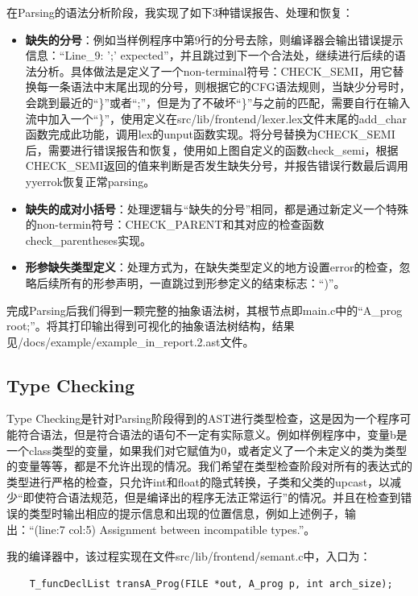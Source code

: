 \documentclass{article}
\begin{document}
在Parsing的语法分析阶段，我实现了如下3种错误报告、处理和恢复：
\begin{itemize}
    \item \textbf{缺失的分号}：例如当样例程序中第9行的分号去除，则编译器会输出错误提示信息：“Line\_9: ';' expected”，并且跳过到下一个合法处，继续进行后续的语法分析。具体做法是定义了一个non-terminal符号：CHECK\_SEMI，用它替换每一条语法中末尾出现的分号，则根据它的CFG语法规则，当缺少分号时，会跳到最近的“\}”或者“;”，但是为了不破坏“\}”与之前的匹配，需要自行在输入流中加入一个“\}”，使用定义在src/lib/frontend/lexer.lex文件末尾的add\_char函数完成此功能，调用lex的unput函数实现。将分号替换为CHECK\_SEMI后，需要进行错误报告和恢复，使用如上图自定义的函数check\_semi，根据CHECK\_SEMI返回的值来判断是否发生缺失分号，并报告错误行数最后调用yyerrok恢复正常parsing。

    \item \textbf{缺失的成对小括号}：处理逻辑与“缺失的分号”相同，都是通过新定义一个特殊的non-termin符号：CHECK\_PARENT和其对应的检查函数check\_parentheses实现。
    
    \item \textbf{形参缺失类型定义}：处理方式为，在缺失类型定义的地方设置error的检查，忽略后续所有的形参声明，一直跳过到形参定义的结束标志：“)”。

\end{itemize}

完成Parsing后我们得到一颗完整的抽象语法树，其根节点即main.c中的“A\_prog root;”。将其打印输出得到可视化的抽象语法树结构，结果见/docs/example/example\_in\_report.2.ast文件。

\subsection{Type Checking}
Type Checking是针对Parsing阶段得到的AST进行类型检查，这是因为一个程序可能符合语法，但是符合语法的语句不一定有实际意义。例如样例程序中，变量b是一个class类型的变量，如果我们对它赋值为0，或者定义了一个未定义的类为类型的变量等等，都是不允许出现的情况。我们希望在类型检查阶段对所有的表达式的类型进行严格的检查，只允许int和float的隐式转换，子类和父类的upcast，以减少“即使符合语法规范，但是编译出的程序无法正常运行”的情况。并且在检查到错误的类型时输出相应的提示信息和出现的位置信息，例如上述例子，输出：“(line:7 col:5) Assignment between incompatible types.”。

我的编译器中，该过程实现在文件src/lib/frontend/semant.c中，入口为：

    \begin{lstlisting}
    T_funcDeclList transA_Prog(FILE *out, A_prog p, int arch_size);
    \end{lstlisting}
\end{document}
